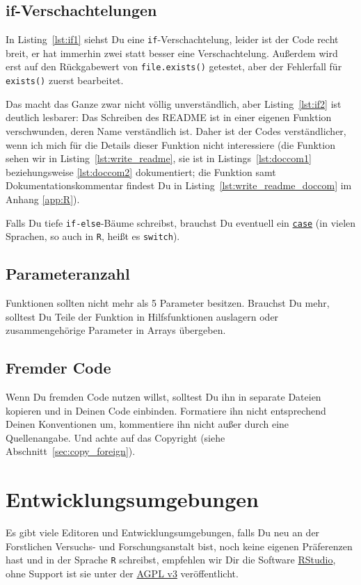 \documentclass[twoside]{scrreprt}
\providecommand{\R}{\texttt{R}}
\providecommand{\code}[1]{\texttt{#1}}
\providecommand{\FVA}[1]{Forstliche#1 Versuchs- und Forschungs\-anstalt}
\begin{document}
\subsection{if-Verschachtelungen\label{sec:if}}
In Listing~\ref{lst:if1} siehst Du eine \code{if}-Verschachtelung, leider ist
der Code recht breit, er hat immerhin zwei statt besser eine Verschachtelung.
Au\ss{}erdem wird erst auf den R\"u{}ckgabewert von
\code{file.exists()} getestet, aber der Fehlerfall f\"u{}r
\code{exists()} zuerst bearbeitet.


Das macht das Ganze zwar nicht v\"o{}llig unverst\"a{}ndlich, aber
Listing~\ref{lst:if2} ist deutlich lesbarer:
Das Schreiben des README ist in
einer eigenen Funktion verschwunden, deren Name verst\"a{}ndlich ist. 
Daher ist der Codes verst\"a{}ndlicher, 
wenn ich mich f\"u{}r die Details dieser Funktion nicht interessiere (die
Funktion sehen wir 
in Listing~\ref{lst:write_readme}, sie ist in Listings~\ref{lst:doccom1} 
beziehungsweise \ref{lst:doccom2} dokumentiert;
die Funktion samt Dokumentationskommentar findest Du in
Listing~\ref{lst:write_readme_doccom}
im Anhang \ref{app:R}).


Falls Du tiefe \code{if-else}-B\"a{}ume schreibst, brauchst Du eventuell
ein \href{https://en.wikipedia.org/wiki/Switch_statement}{\code{case}} 
(in vielen Sprachen, so auch in \R{}, hei\ss{}t es \code{switch}).
\subsection{Parameteranzahl\label{sec:parameteranzahl}}
Funktionen sollten nicht mehr als 5 Parameter besitzen.
Brauchst Du mehr, solltest Du Teile der Funktion in Hilfsfunktionen auslagern
oder zusammengeh\"o{}rige Parameter in Arrays \"u{}bergeben.

\subsection{Fremder Code}
Wenn Du fremden Code nutzen willst, solltest Du ihn in separate Dateien kopieren
und in Deinen Code einbinden.
Formatiere ihn nicht entsprechend Deinen Konventionen um,
kommentiere ihn nicht au\ss{}er durch eine Quellenangabe.
Und achte auf das Copyright (siehe Abschnitt~\ref{sec:copy_foreign}).

\section{Entwicklungsumgebungen}
Es gibt viele Editoren und Entwicklungsumgebungen, falls Du neu an der
\FVA{n} bist, noch keine
eigenen Pr\"a{}ferenzen hast und in der Sprache \R{} schreibst, empfehlen wir
Dir die Software \href{http://www.rstudio.com/products/rstudio/}{RStudio},
ohne Support ist sie unter der 
\href{https://www.gnu.org/licenses/agpl-3.0.html}{AGPL v3} ver\"o{}ffentlicht.
\end{document}
